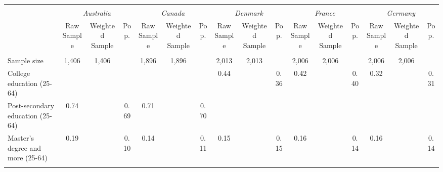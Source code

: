\begin{tabular}{l*{15}{c}}
\toprule
\hline \\[-1.8ex]
\multicolumn{1}{c}{\em{ }} & \multicolumn{3}{c}{\em{Australia}} & \multicolumn{3}{c}{\em{Canada}} & \multicolumn{3}{c}{\em{Denmark}} & \multicolumn{3}{c}{\em{France}} & \multicolumn{3}{c}{\em{Germany}} \\
\cmidrule(l{3pt}r{3pt}){2-4} \cmidrule(l{3pt}r{3pt}){5-7} \cmidrule(l{3pt}r{3pt}){8-10} \cmidrule(l{3pt}r{3pt}){11-13} \cmidrule(l{3pt}r{3pt}){14-16}
\noalign{\smallskip}  & Raw Sample & Weighted Sample & Pop. & Raw Sample & Weighted Sample & Pop. & Raw Sample & Weighted Sample & Pop. & Raw Sample & Weighted Sample & Pop. & Raw Sample & Weighted Sample & Pop. \\
\hline \\[-1.8ex] 
Sample size & 1,406 & 1,406 & & 1,896 & 1,896 & & 2,013 & 2,013 & & 2,006 & 2,006 & & 2,006 & 2,006 & \\
\noalign{\smallskip}\hline \noalign{\smallskip}
College education (25-64) & & & & & & & 0.44 & & 0.36 & 0.42 & & 0.40 & 0.32 & & 0.31\\
Post-secondary education (25-64) & 0.74 & & 0.69 & 0.71 & & 0.70 & & & & & & & & & \\
Master's degree and more (25-64) & 0.19 & & 0.10 & 0.14 & & 0.11 & 0.15 & & 0.15 & 0.16 & & 0.14 & 0.16 & & 0.14 \\
\\
\bottomrule
\end{tabular}